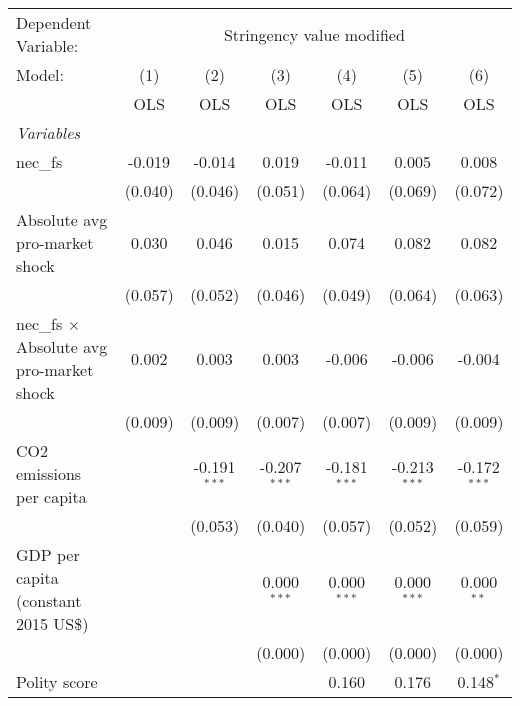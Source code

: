 
\begingroup
\centering
\begin{tabular}{lcccccc}
   \toprule
   Dependent Variable: & \multicolumn{6}{c}{Stringency value modified}\\
   Model:                                           & (1)     & (2)            & (3)            & (4)            & (5)            & (6)\\  
                                                    &  OLS    & OLS            & OLS            & OLS            & OLS            & OLS\\  
   \midrule
   \emph{Variables}\\
   nec\_fs                                          & -0.019  & -0.014         & 0.019          & -0.011         & 0.005          & 0.008\\   
                                                    & (0.040) & (0.046)        & (0.051)        & (0.064)        & (0.069)        & (0.072)\\   
   Absolute avg pro-market shock                    & 0.030   & 0.046          & 0.015          & 0.074          & 0.082          & 0.082\\   
                                                    & (0.057) & (0.052)        & (0.046)        & (0.049)        & (0.064)        & (0.063)\\   
   nec\_fs $\times$ Absolute avg pro-market shock   & 0.002   & 0.003          & 0.003          & -0.006         & -0.006         & -0.004\\   
                                                    & (0.009) & (0.009)        & (0.007)        & (0.007)        & (0.009)        & (0.009)\\   
   CO2 emissions per capita                         &         & -0.191$^{***}$ & -0.207$^{***}$ & -0.181$^{***}$ & -0.213$^{***}$ & -0.172$^{***}$\\   
                                                    &         & (0.053)        & (0.040)        & (0.057)        & (0.052)        & (0.059)\\   
   GDP per capita (constant 2015 US\$)              &         &                & 0.000$^{***}$  & 0.000$^{***}$  & 0.000$^{***}$  & 0.000$^{**}$\\   
                                                    &         &                & (0.000)        & (0.000)        & (0.000)        & (0.000)\\   
   Polity score                                     &         &                &                & 0.160          & 0.176          & 0.148$^{*}$\\   

\end{tabular}
